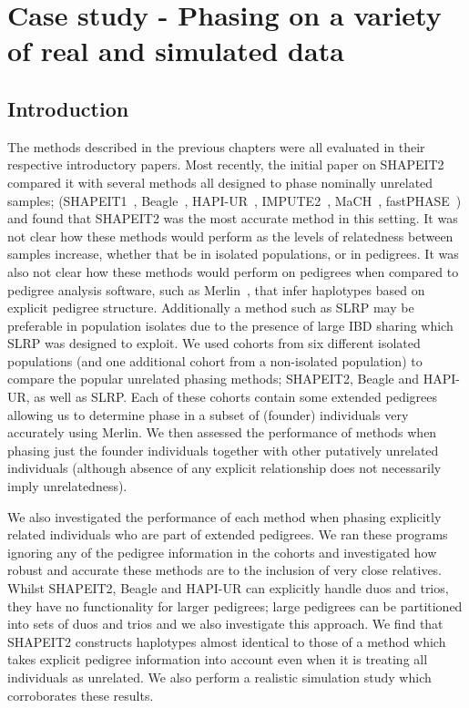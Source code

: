 
\chapter{Case study - Phasing on a variety of real and simulated data}

\section{Introduction}

The methods described in the previous chapters were all evaluated in their respective introductory papers.  Most recently, the initial paper on SHAPEIT2~\citep{delaneau2013} compared it with several methods all designed to phase nominally unrelated samples; (SHAPEIT1~\citep{delaneau2011linear}, Beagle~\citep{browning2009unified}, HAPI-UR~\citep{williams2012phasing}, IMPUTE2~\citep{howie2009flexible}, MaCH~\citep{li2010mach}, fastPHASE~\citep{scheet2006fast}) and found that SHAPEIT2 was the most accurate method in this setting. It was not clear how these methods would perform as the levels of relatedness between samples increase, whether that be in isolated populations, or in pedigrees. It was also not clear how these methods would perform on pedigrees when compared to pedigree analysis software, such as Merlin~\citep{abecasis2002merlin}, that infer haplotypes based on explicit pedigree structure.  Additionally a method such as SLRP may be preferable in population isolates due to the presence of large IBD sharing which SLRP was designed to exploit.
\newpage
We used cohorts from six different isolated populations (and one additional cohort from a non-isolated population)  to compare the popular unrelated phasing methods; SHAPEIT2, Beagle and HAPI-UR, as well as SLRP. Each of these cohorts contain some extended pedigrees allowing us to determine phase in a subset of (founder) individuals very accurately using Merlin. We then assessed the performance of methods when phasing just the founder individuals together with other putatively unrelated individuals (although absence of any explicit relationship does not necessarily imply unrelatedness). 

We also investigated the performance of each method when phasing explicitly related individuals who are part of extended pedigrees. We ran these programs ignoring any of the pedigree information in the cohorts and investigated how robust and accurate these methods are to the inclusion of very close relatives. Whilst SHAPEIT2, Beagle and HAPI-UR can explicitly handle duos and trios, they have no functionality for larger pedigrees; large pedigrees can be partitioned into sets of duos and trios and we also investigate this approach. We find that SHAPEIT2 constructs haplotypes almost identical to those of a method which takes explicit pedigree information into account even when it is treating all individuals as unrelated. We also perform a realistic simulation study which corroborates these results.

